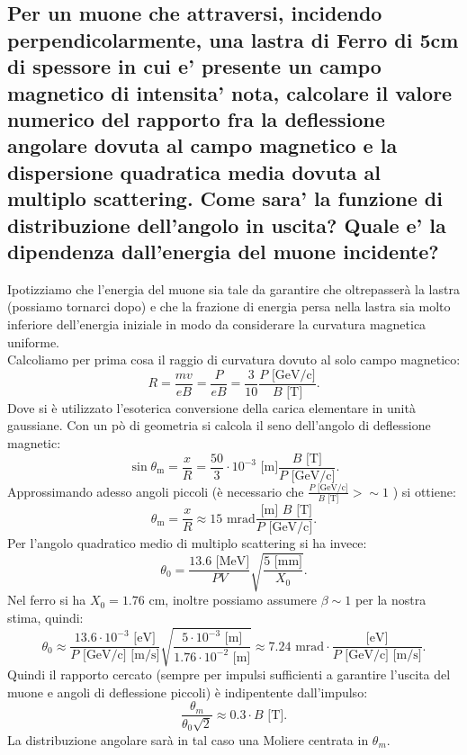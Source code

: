 \subsection[]{Per un muone che attraversi, incidendo perpendicolarmente, una lastra di Ferro di 5cm di spessore in cui e' presente un campo magnetico di intensita' nota, calcolare il valore numerico del rapporto fra la deflessione angolare dovuta al campo magnetico e la dispersione quadratica media dovuta al multiplo scattering. Come sara’ la funzione di distribuzione dell’angolo in uscita? Quale e’ la dipendenza dall’energia del muone incidente?
}
\label{sec:4.b.20}
Ipotizziamo che l'energia del muone sia tale da garantire che oltrepasserà la lastra (possiamo tornarci dopo) e che la frazione di energia persa nella lastra sia molto inferiore dell'energia iniziale in modo da considerare la curvatura magnetica uniforme.\\
Calcoliamo per prima cosa il raggio di curvatura dovuto al solo campo magnetico:
\[
	R= \frac{mv}{eB}= \frac{P}{e B} = \frac{3}{10} \frac{P  \text{ [GeV/c]}}{B \text{ [T]}}
.\] 
Dove si è utilizzato l'esoterica conversione della carica elementare in unità gaussiane. Con un pò di geometria si calcola il seno dell'angolo di deflessione magnetic:
\[
	\sin\theta_{\text{m}}= \frac{x}{R} = \frac{50}{3} \cdot 10^{-3}\text{ [m]}  \frac{B \text{ [T]}}{P  \text{ [GeV/c]}}
.\] 
Approssimando adesso angoli piccoli (è necessario che $ \frac{P \text{ [GeV/c]}}{B \text{ [T]}}>\sim 1$ ) si ottiene:
\[
	\theta_{\text{m}}= \frac{x}{R} \approx 15 \text{ mrad}  \frac{\text{ [m] } B \text{ [T]}}{P  \text{ [GeV/c]}}
.\] 
Per l'angolo quadratico medio di multiplo scattering si ha invece:
\[
	\theta_0= \frac{13.6 \text{ [MeV]}}{PV} \sqrt{ \frac{5 \text{ [mm]}}{X_0}} 
.\] 
Nel ferro si ha $X_0 = 1.76$ cm, inoltre possiamo assumere $\beta \sim 1$ per la nostra stima, quindi:
\[
	\theta_0 \approx \frac{13.6 \cdot 10^{-3} \text{ [eV]}}{P \text{ [GeV/c] [m/s]}} \sqrt{ \frac{5 \cdot 10^{-3}\text{ [m]} }{1.76 \cdot 10^{-2}\text{ [m]}}}
	\approx 7.24 \text{ mrad} \cdot \frac{\text{[eV]}}{P\text{ [GeV/c] [m/s]} }
.\] 
Quindi il rapporto cercato (sempre per impulsi sufficienti a garantire l'uscita del muone e angoli di deflessione piccoli) è indipentente dall'impulso:
\[
	\frac{\theta_{m}}{\theta_0 \sqrt{2}} \approx 0.3\cdot B \text{ [T]}
.\]
La distribuzione angolare sarà in tal caso una Moliere centrata in $\theta_{m}$.

